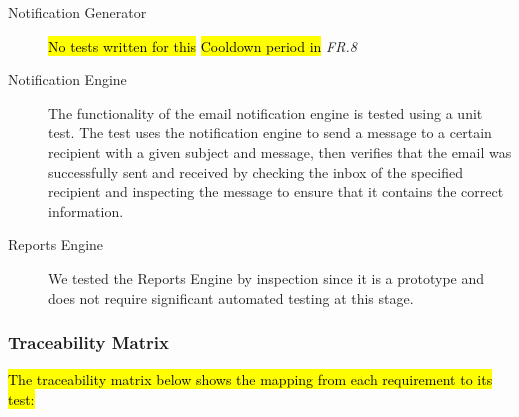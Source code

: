 \documentclass[10pt,a4paper]{article}
\newcommand{\frit}[1]{\textit{FR.#1}}
\begin{document}
\begin{description}
  \item[Notification Generator] \hl{No tests written for this}
  \hl{Cooldown period in} \frit{8}
  
  \item[Notification Engine]
  The functionality of the email notification engine is tested using a unit test. The test uses the notification engine to send a message to a certain recipient with a given subject and message, then verifies that the email was successfully sent and received by checking the inbox of the specified recipient and inspecting the message to ensure that it contains the correct information.

  \item[Reports Engine] We tested the Reports Engine by inspection since it is a prototype and does not require significant automated testing at this stage.

 \end{description}

\subsubsection{Traceability Matrix}


\hl{The traceability matrix below shows the mapping from each requirement to its test:} %
\end{document}
